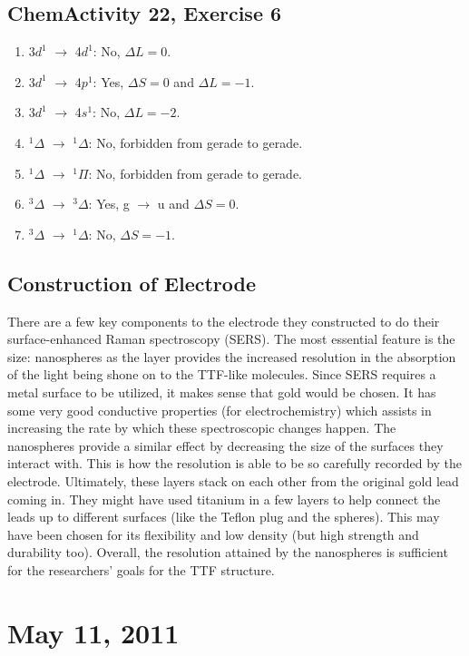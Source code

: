 \section{ChemActivity 22, Exercise 6}
\begin{enumerate}
  \item 3$d^1$ $\rightarrow$ 4$d^1$: No, $\Delta L = 0$.
  \item 3$d^1$ $\rightarrow$ 4$p^1$: Yes, $\Delta S = 0$ and $\Delta L = -1$.
  \item 3$d^1$ $\rightarrow$ 4$s^1$: No, $\Delta L = -2$.
  \item $^1\Delta$ $\rightarrow$ $^1\Delta$: No, forbidden from gerade to gerade.
  \item $^1\Delta$ $\rightarrow$ $^1\Pi$: No, forbidden from gerade to gerade.
  \item $^3\Delta$ $\rightarrow$ $^3\Delta$: Yes, g $\rightarrow$ u and $\Delta S = 0$.
  \item $^3\Delta$ $\rightarrow$ $^1\Delta$: No, $\Delta S = -1$.
\end{enumerate}

\section{Construction of Electrode}
There are a few key components to the electrode they constructed to do their surface-enhanced Raman spectroscopy (SERS). The most essential feature is the size: nanospheres as the layer provides the increased resolution in the absorption of the light being shone on to the TTF-like molecules. Since SERS requires a metal surface to be utilized, it makes sense that gold would be chosen. It has some very good conductive properties (for electrochemistry) which assists in increasing the rate by which these spectroscopic changes happen. The nanospheres provide a similar effect by decreasing the size of the surfaces they interact with. This is how the resolution is able to be so carefully recorded by the electrode. Ultimately, these layers stack on each other from the original gold lead coming in. They might have used titanium in a few layers to help connect the leads up to different surfaces (like the Teflon plug and the spheres). This may have been chosen for its flexibility and low density (but high strength and durability too). Overall, the resolution attained by the nanospheres is sufficient for the researchers' goals for the TTF structure.


\chapter{May 11, 2011}

